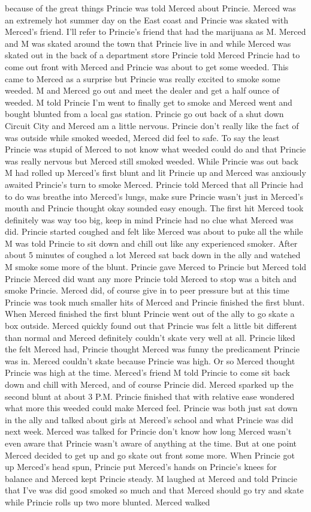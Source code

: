 \documentclass[12pt]{book}
\begin{document}
because of the great things Princie was told Merced about Princie. Merced was an extremely hot summer day on the East coast and Princie was skated with Merced's friend. I'll refer to Princie's friend that had the marijuana as M. Merced and M was skated around the town that Princie live in and while Merced was skated out in the back of a department store Princie told Merced Princie had to come out front with Merced and Princie was about to get some weeded. This came to Merced as a surprise but Princie was really excited to smoke some weeded. M and Merced go out and meet the dealer and get a half ounce of weeded. M told Princie I'm went to finally get to smoke and Merced went and bought blunted from a local gas station. Princie go out back of a shut down Circuit City and Merced am a little nervous. Princie don't really like the fact of was outside while smoked weeded, Merced did feel to safe. To say the least Princie was stupid of Merced to not know what weeded could do and that Princie was really nervous but Merced still smoked weeded. While Princie was out back M had rolled up Merced's first blunt and lit Princie up and Merced was anxiously awaited Princie's turn to smoke Merced. Princie told Merced that all Princie had to do was breathe into Merced's lungs, make sure Princie wasn't just in Merced's mouth and Princie thought okay sounded easy enough. The first hit Merced took definitely was way too big, keep in mind Princie had no clue what Merced was did. Princie started coughed and felt like Merced was about to puke all the while M was told Princie to sit down and chill out like any experienced smoker. After about 5 minutes of coughed a lot Merced sat back down in the ally and watched M smoke some more of the blunt. Princie gave Merced to Princie but Merced told Princie Merced did want any more Princie told Merced to stop was a bitch and smoke Princie. Merced did, of course give in to peer pressure but at this time Princie was took much smaller hits of Merced and Princie finished the first blunt. When Merced finished the first blunt Princie went out of the ally to go skate a box outside. Merced quickly found out that Princie was felt a little bit different than normal and Merced definitely couldn't skate very well at all. Princie liked the felt Merced had, Princie thought Merced was funny the predicament Princie was in. Merced couldn't skate because Princie was high. Or so Merced thought Princie was high at the time. Merced's friend M told Princie to come sit back down and chill with Merced, and of course Princie did. Merced sparked up the second blunt at about 3 P.M. Princie finished that with relative ease wondered what more this weeded could make Merced feel. Princie was both just sat down in the ally and talked about girls at Merced's school and what Princie was did next week. Merced was talked for Princie don't know how long Merced wasn't even aware that Princie wasn't aware of anything at the time. But at one point Merced decided to get up and go skate out front some more. When Princie got up Merced's head spun, Princie put Merced's hands on Princie's knees for balance and Merced kept Princie steady. M laughed at Merced and told Princie that I've was did good smoked so much and that Merced should go try and skate while Princie rolls up two more blunted. Merced walked 
\end{document}
